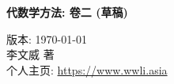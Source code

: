 


\begin{titlepage}

\begin{center}
	\Huge {}\textbf{代数学方法: 卷二 (草稿)}  \\ \vspace{0.7em}
\end{center}
\vspace{1em}
\begin{center}
	{\Large 版本: \sffamily\today} \\ \vspace{1em}
	{\Large 李文威 \quad 著} \\ \vspace{1.5em}
	个人主页:\; \href{https://www.wwli.asia}{https://www.wwli.asia}
\end{center}
\vfill


\end{titlepage}

